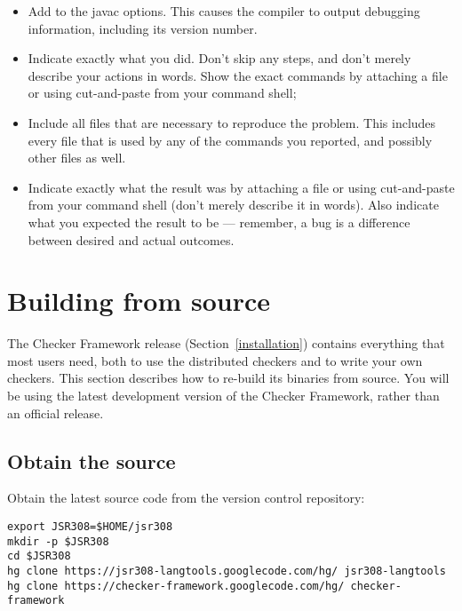 \begin{itemize}
\item
  Add  to the javac options.  This causes the compiler to output
  debugging information, including its version number.
\item
  Indicate exactly what you did.  Don't skip any steps, and don't merely
  describe your actions in words.  Show the exact commands by attaching a
  file or using cut-and-paste from your command shell;
\item
  Include all files that are necessary to reproduce the problem.  This
  includes every file that is used by any of the commands you reported, and
  possibly other files as well.
\item
  Indicate exactly what the result was by attaching a file or using
  cut-and-paste from your command shell (don't merely describe it in
  words).  Also indicate what you expected the result to be --- remember, a
  bug is a difference between desired and actual outcomes.
\end{itemize}


\section{Building from source\label{build-source}}

The Checker Framework release (Section~\ref{installation}) contains
everything that most users need, both to use the distributed checkers and
to write your own checkers.  This section describes how to re-build its
binaries from source.  You will be using the latest development version of
the Checker Framework, rather than an official release.



\subsection{Obtain the source}

Obtain the latest source code from the version control repository:

\begin{Verbatim}
export JSR308=$HOME/jsr308
mkdir -p $JSR308
cd $JSR308
hg clone https://jsr308-langtools.googlecode.com/hg/ jsr308-langtools
hg clone https://checker-framework.googlecode.com/hg/ checker-framework
\end{Verbatim}

